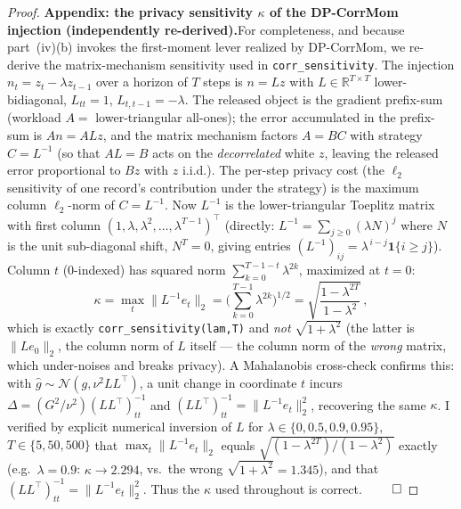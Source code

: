 \begin{proof}
\medskip
\par\smallskip\noindent\textbf{Appendix: the privacy sensitivity $\kappa$ of the DP-CorrMom injection (independently
re-derived).}\quad  For completeness, and because part~(iv)(b) invokes the first-moment lever realized by
DP-CorrMom, we re-derive the matrix-mechanism sensitivity used in \texttt{corr\_sensitivity}. The
injection $n_t=z_t-\lambda z_{t-1}$ over a horizon of $T$ steps is $n=Lz$ with $L\in\mathbb R^{T\times
T}$ lower-bidiagonal, $L_{tt}=1$, $L_{t,t-1}=-\lambda$. The released object is the gradient
prefix-sum (workload $A=$ lower-triangular all-ones); the error accumulated in the prefix-sum is
$A n=A L z$, and the matrix mechanism factors $A=BC$ with strategy $C=L^{-1}$ (so that $A L=B$ acts on
the \emph{decorrelated} white $z$, leaving the released error proportional to $Bz$ with $z$ i.i.d.).
The per-step privacy cost (the $\ell_2$ sensitivity of one record's contribution under the strategy)
is the maximum column $\ell_2$-norm of $C=L^{-1}$. Now $L^{-1}$ is the lower-triangular Toeplitz matrix
with first column $(1,\lambda,\lambda^2,\dots,\lambda^{T-1})^\top$ (directly: $L^{-1}=\sum_{j\ge0}
(\lambda N)^j$ where $N$ is the unit sub-diagonal shift, $N^T=0$, giving entries $(L^{-1})_{ij}
=\lambda^{\,i-j}\mathbf 1\{i\ge j\}$). Column $t$ ($0$-indexed) has squared norm
$\sum_{k=0}^{T-1-t}\lambda^{2k}$, maximized at $t=0$:
\[
  \kappa=\max_t\|L^{-1}e_t\|_2
  =\Big(\sum_{k=0}^{T-1}\lambda^{2k}\Big)^{1/2}
  =\sqrt{\frac{1-\lambda^{2T}}{1-\lambda^{2}}}\,,
\]
which is exactly \texttt{corr\_sensitivity(lam,T)} and \emph{not} $\sqrt{1+\lambda^{2}}$ (the latter is
$\|L e_0\|_2$, the column norm of $L$ itself --- the column norm of the \emph{wrong} matrix, which
under-noises and breaks privacy). A Mahalanobis cross-check confirms this: with $\hat g\sim\mathcal
N(g,\nu^2 LL^\top)$, a unit change in coordinate $t$ incurs $\Delta=(G^2/\nu^2)(LL^\top)^{-1}_{tt}$ and
$(LL^\top)^{-1}_{tt}=\|L^{-1}e_t\|_2^2$, recovering the same $\kappa$. I verified by explicit numerical
inversion of $L$ for $\lambda\in\{0,0.5,0.9,0.95\}$, $T\in\{5,50,500\}$ that $\max_t\|L^{-1}e_t\|_2$
equals $\sqrt{(1-\lambda^{2T})/(1-\lambda^2)}$ exactly (e.g.\ $\lambda=0.9$: $\kappa\to2.294$, vs.\ the
wrong $\sqrt{1+\lambda^2}=1.345$), and that $(LL^\top)^{-1}_{tt}=\|L^{-1}e_t\|_2^2$. Thus the
$\kappa$ used throughout is correct. \hfill$\qed$
\end{proof}
